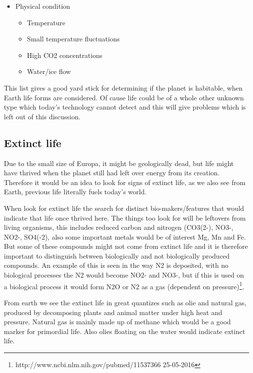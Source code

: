      \begin{itemize}
       \item  Physical condition 
       
       \begin{itemize}
         \item Temperature 
         \item Small temperature fluctuations
         \item High CO2 concentrations
         \item Water/ice flow
           
       \end{itemize}
     \end{itemize}
   
This list gives a good yard stick for determining if the planet is habitable, when Earth life forms are considered. Of cause life could be of a whole other unknown type which today’s technology cannot detect and this will give problems which is left out of this discussion. \par

\subsection{Extinct life}
Due to the small size of Europa, it might be geologically dead, but life might have thrived when the planet still had left over energy from its creation. Therefore it would be an idea to look for signs of extinct life, as we also see from Earth, previous life literally fuels today’s world. \par
When look for extinct life the search for distinct bio-makers/features that would indicate that life once thrived here. The things too look for will be leftovers from living organisms, this includes reduced carbon and nitrogen (CO3(2-), NO3-, NO2-, SO4(-2), also some important metals would be of interest Mg, Mn and Fe. But some of these compounds might not come from extinct life and it is therefore important to distinguish between biologically and not biologically produced compounds. An example of this is seen in the way N2 is deposited, with no biological processes the N2 would become NO2- and NO3-, but if this is used on a biological process it would form N2O or N2 as a gas  (dependent on pressure)\footnote{http://www.ncbi.nlm.nih.gov/pubmed/11537366 25-05-2016}. \par
From earth we see the extinct life in great quantizes such as olie and natural gas, produced by decomposing plants and animal matter under high heat and pressure. Natural gas is mainly made up of methane which would be a good marker for primordial life. Also olies floating on the water would indicate extinct life. \par

